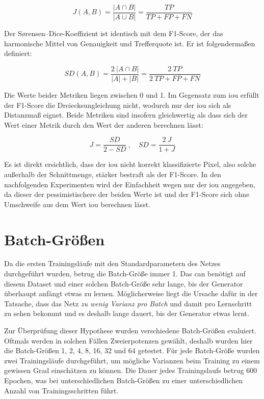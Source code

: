 \begin{equation}
J(A, B) = \frac{| A \cap B |}{| A \cup B |} = \frac{TP}{TP + FP + FN}
\end{equation}

Der Sørensen–Dice-Koeffizient ist identisch mit dem F1-Score, der das harmonische Mittel von Genauigkeit und Trefferquote ist.
Er ist folgendermaßen definiert:

\begin{equation}
SD(A, B) = \frac{2 \ | A \cap B |}{| A | + | B |} = \frac{2 \ TP}{2 \ TP + FP + FN}
\end{equation}

Die Werte beider Metriken liegen zwischen 0 und 1.
Im Gegensatz zum \gls{iou} erfüllt der F1-Score die Dreiecksungleichung nicht, wodurch nur der \gls{iou} sich als Distanzmaß eignet.
Beide Metriken sind insofern gleichwertig als dass sich der Wert einer Metrik durch den Wert der anderen berechnen lässt:

\begin{equation}
J = \frac{SD}{2 - SD} \ , \quad SD = \frac{2 \ J}{1 + J}
\end{equation}

Es ist direkt ersichtlich, dass der \gls{iou} nicht korrekt klassifizierte Pixel, also solche außerhalb der Schnittmenge, stärker bestraft als der F1-Score.
In den nachfolgenden Experimenten wird der Einfachheit wegen nur der \gls{iou} angegeben, da dieser der pessimistischere der beiden Werte ist und der F1-Score sich ohne Umschweife aus dem Wert \gls{iou} berechnen lässt.



\section{Batch-Größen}\label{sec:batchsize}

Da die ersten Trainingsläufe mit den Standardparametern des Netzes durchgeführt wurden, betrug die Batch-Größe immer 1.
Das \gls{can} benötigt auf diesem Dataset und einer solchen Batch-Größe sehr lange, bis der Generator überhaupt anfängt etwas zu lernen.
Möglicherweise liegt die Ursache dafür in der Tatsache, dass das Netz \emph{zu wenig Varianz pro Batch} und damit pro Lernschritt zu sehen bekommt und es deshalb lange dauert, bis der Generator etwas lernt.

Zur Überprüfung dieser Hypothese wurden verschiedene Batch-Größen evaluiert.
Oftmals werden in solchen Fällen Zweierpotenzen gewählt, deshalb wurden hier die Batch-Größen 1, 2, 4, 8, 16, 32 und 64 getestet.
Für jede Batch-Größe wurden zwei Trainingsläufe durchgeführt, um mögliche Varianzen beim Training zu einem gewissen Grad einschätzen zu können.
Die Dauer jedes Trainingslaufs betrug 600 Epochen, was bei unterschiedlichen Batch-Größen zu einer unterschiedlichen Anzahl von Trainingsschritten führt.

